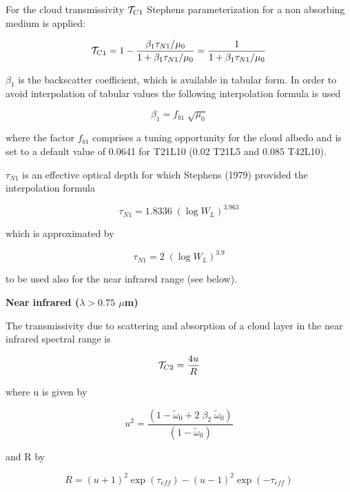 For the cloud transmissivity ${\cal T}_{C1}$ Stephens
parameterization for a non absorbing medium is
applied:

\begin{equation}
{\cal T}_{C1}=1-
\frac{\beta_1\tau_{N1}/\mu_0}{1+\beta_1\tau_{N1}
/\mu_0} = \frac{1}{ 1+\beta_1 \tau_{N1}/\mu_0}
\end{equation}

$\beta_1$ is the backscatter coefficient, which is
available in tabular form. In order to avoid interpolation
of tabular values the following interpolation formula is
used

\begin{equation}
\beta_1 =  f_{b1} \; \sqrt{\mu_0}
\end{equation}

where the factor $f_{b1}$ comprises a tuning
opportunity for the cloud albedo and is set to a default
value of 0.0641 for T21L10 (0.02 T21L5 and 0.085 T42L10).

$\tau_{N1}$ is an effective optical depth for which
Stephens (1979) provided the interpolation formula

\begin{equation}
\tau_{N1}= 1.8336 \; (\log{W_L})^{3.963}
\end{equation}

which is approximated by 

\begin{equation}
\tau_{N1}= 2\; (\log{W_L})^{3.9}
\end{equation}

to be used also for the near infrared range (see below). 

{\bf  Near infrared ($\lambda > 0.75$ $\mu$m)}

The transmissivity due to scattering and absorption of
a cloud layer in the near infrared spectral range is

\begin{equation}
{\cal T}_{C2}=\frac{4u}{R}
\end{equation}

where u is given by

\begin{equation}
u^2=\frac{(1-
\tilde{\omega}_0+2\; \beta_2 \; \tilde{\omega}_0)}{(1-
\tilde{\omega}_0)}
\end{equation}


and R by

\begin{equation}
R=(u+1)^2 \exp{(\tau_{eff})}
-(u-1)^2 \exp{(-\tau_{eff})}
\end{equation}

